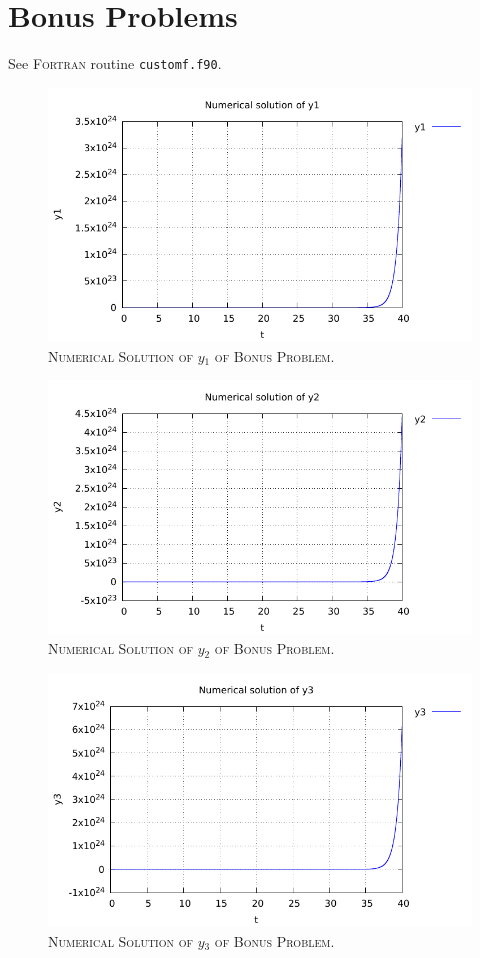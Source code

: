 \documentclass[a4paper,oneside]{book}
\numberwithin{equation}{chapter}
\begin{document}
\section{Bonus Problems}
See \textsc{Fortran} routine \texttt{customf.f90}.
\begin{figure}[H]
\centering
\includegraphics[scale=1.1]{f_1}
\caption{\textsc{Numerical Solution of $y_1$ of Bonus Problem.}}
\end{figure}
\begin{figure}[H]
\centering
\includegraphics[scale=1.1]{f_2}
\caption{\textsc{Numerical Solution of $y_2$ of Bonus Problem.}}
\end{figure}
\begin{figure}[H]
\centering
\includegraphics[scale=1.1]{f_3}
\caption{\textsc{Numerical Solution of $y_3$ of Bonus Problem.}}
\end{figure}
\end{document}

